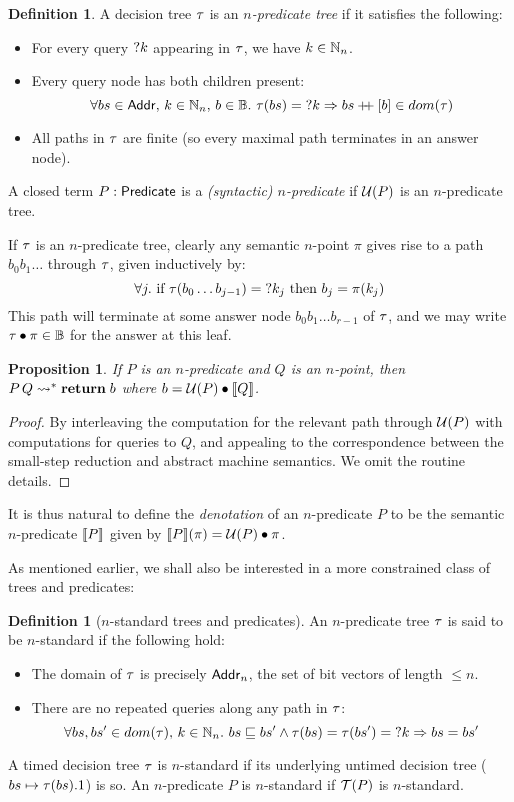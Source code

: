 \documentclass[12pt,phd,lfcs,twoside,openright,logo,leftchapter,normalheadings]{infthesis}
\theoremstyle{plain}
\newtheorem{proposition}[theorem]{Proposition}
\theoremstyle{definition}
\newtheorem{definition}[theorem]{Definition}
\begin{document}
\begin{definition}  \label{def:n-predicate}
A decision tree $\tau$ is an \emph{$n$-predicate tree} if it satisfies the following:
\begin{itemize}
  \item For every query $\mathord{?} k$ appearing in $\tau$, we have $k \in \mathbb{N}_n$.
  \item Every query node has both children present:
  \[ \forall bs \in \mathsf{Addr},\, k \in \mathbb{N}_n,\, b \in \mathbb{B}.~ \tau(bs) = \mathord{?} k \Rightarrow bs \mathbin{+\!\!+} [b] \in dom(\tau) \]
  \item All paths in $\tau$ are finite (so every maximal path terminates in an answer node).
\end{itemize}
A closed term $P: \mathsf{Predicate}$ is a \emph{(syntactic) $n$-predicate} if $\mathcal{U}(P)$ is an $n$-predicate tree.
\end{definition}

If $\tau$ is an $n$-predicate tree, clearly any semantic $n$-point $\pi$ gives rise to a path $b_0 b_1 \dots $
through $\tau$, given inductively by:
{\small
\[  \forall j.~ \mbox{if~} \tau(b_0\dots b_{j-1}) = \mathord{?} k_j \mbox{~then~} b_j = \pi(k_j)  \]
}%
This path will terminate at some answer node $b_0 b_1 \dots b_{r-1}$ of $\tau$,
and we may write $\tau \bullet \pi \in \mathbb{B}$ for the answer at this leaf.

\begin{proposition}  \label{prop:pred-tree}
If $P$ is an $n$-predicate and $Q$ is an $n$-point, then
$P\,Q \leadsto^\ast \mathbf{return}\;b$ where $b = \tru(P) \bullet \val{Q}$.
\end{proposition}

\begin{proof}
By interleaving the computation for the relevant path through $\mathcal{U}(P)$
with computations for queries to $Q$, and appealing to the correspondence between
the small-step reduction and abstract machine semantics.
We omit the routine details.
\end{proof}

It is thus natural to define the \emph{denotation} of an $n$-predicate
$P$ to be the semantic $n$-predicate $\val{P}$ given by
$\llbracket P \rrbracket (\pi) = \mathcal{U}(P) \bullet \pi$.

As mentioned earlier, we shall also be interested in a more constrained
class of trees and predicates:

\begin{definition}[$n$-standard trees and predicates]
An $n$-predicate tree $\tau$ is said to be $n$-standard if the following hold:
\begin{itemize}
\item The domain of $\tau$ is precisely $\mathsf{Addr}_n$, the set of bit vectors of length $\leq n$.
\item There are no repeated queries along any path in $\tau$:
  \[ \forall bs, bs' \in dom(\tau),\, k \in \mathbb{N}_n.~ bs \sqsubseteq bs' \wedge \tau(bs)=\tau(bs')=\mathord{?} k \Rightarrow bs=bs' \]
\end{itemize}
A timed decision tree $\tau$ is $n$-standard if its underlying untimed
decision tree ($bs \mapsto \tau(bs).1$) is so.
An $n$-predicate $P$ is $n$-standard if $\mathcal{T}(P)$ is $n$-standard.
\end{definition}
\end{document}
